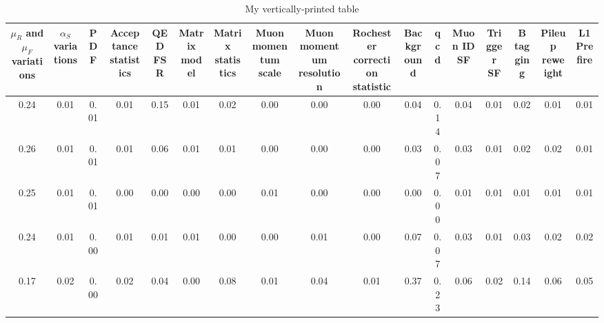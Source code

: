 \begin{sidewaystable}[ht]
  \centering
  \caption{My vertically‐printed table}
  \label{tab:vertical}
  \scriptsize
{\setlength{\tabcolsep}{2pt}
  \begin{tabular}{|c|c|c|c|c|c|c|c|c|c|c|c|c|c|c|c|c|}
  \hline
  $\mu_R$ and $\mu_F$ variations & $\alpha_S$ variations & PDF & Acceptance statistics & QED FSR & Matrix model & Matrix statistics & Muon momentum scale & Muon momentum resolution & Rochester correction statistic & Background & qcd & Muon ID SF & Trigger SF & B tagging & Pileup reweight & L1 Prefire \\
  \hline
  0.24 & 0.01 & 0.01 & 0.01 & 0.15 & 0.01 & 0.02 & 0.00 & 0.00 & 0.00 & 0.04 & 0.14 & 0.04 & 0.01 & 0.02 & 0.01 & 0.01 \\
  0.26 & 0.01 & 0.01 & 0.01 & 0.06 & 0.01 & 0.01 & 0.00 & 0.00 & 0.00 & 0.03 & 0.07 & 0.03 & 0.01 & 0.02 & 0.02 & 0.01 \\
  0.25 & 0.01 & 0.01 & 0.00 & 0.00 & 0.00 & 0.00 & 0.01 & 0.00 & 0.00 & 0.00 & 0.00 & 0.01 & 0.01 & 0.01 & 0.01 & 0.01 \\
  0.24 & 0.01 & 0.00 & 0.01 & 0.01 & 0.01 & 0.00 & 0.00 & 0.01 & 0.00 & 0.07 & 0.07 & 0.03 & 0.01 & 0.03 & 0.02 & 0.02 \\
  0.17 & 0.02 & 0.00 & 0.02 & 0.04 & 0.00 & 0.08 & 0.01 & 0.04 & 0.01 & 0.37 & 0.23 & 0.06 & 0.02 & 0.14 & 0.06 & 0.05 \\
  \hline
  \end{tabular}
}
\end{sidewaystable}